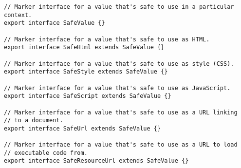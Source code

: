 \begin{verbatim}
// Marker interface for a value that's safe to use in a particular context.
export interface SafeValue {}

// Marker interface for a value that's safe to use as HTML.
export interface SafeHtml extends SafeValue {}

// Marker interface for a value that's safe to use as style (CSS).
export interface SafeStyle extends SafeValue {}

// Marker interface for a value that's safe to use as JavaScript.
export interface SafeScript extends SafeValue {}

// Marker interface for a value that's safe to use as a URL linking
// to a document.
export interface SafeUrl extends SafeValue {}

// Marker interface for a value that's safe to use as a URL to load
// executable code from.
export interface SafeResourceUrl extends SafeValue {}
\end{verbatim}
